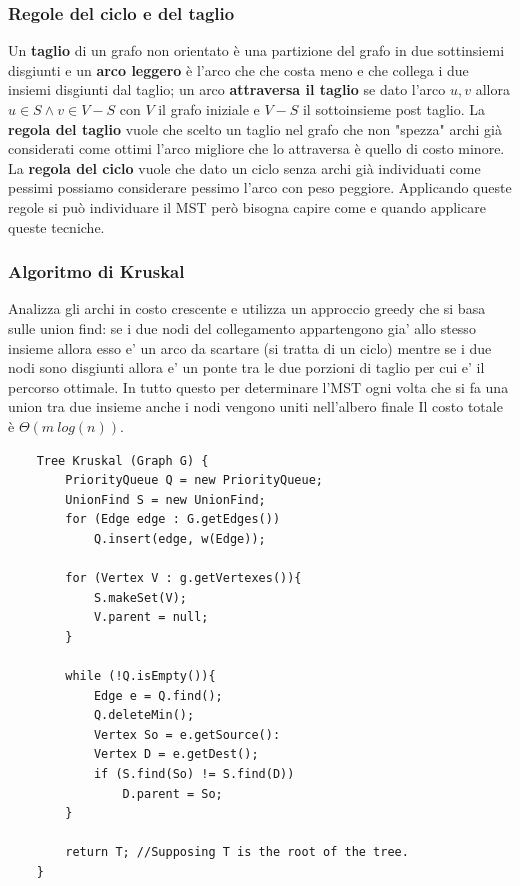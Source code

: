 \documentclass{article}
\begin{document}
\subsubsection{Regole del ciclo e del taglio}
Un \textbf{taglio} di un grafo non orientato è una partizione del grafo in due sottinsiemi disgiunti e un \textbf{arco leggero} è l'arco che che costa meno e che collega i due insiemi disgiunti dal taglio; 
un arco \textbf{attraversa il taglio} se dato l'arco ${u, v}$ allora $u \in S \land v \in V-S$ con $V$ il grafo iniziale e $V - S$ il sottoinsieme post taglio.
La \textbf{regola del taglio} vuole che scelto un taglio nel grafo che non "spezza" archi già considerati come ottimi l'arco migliore che lo attraversa è quello di costo minore.
La \textbf{regola del ciclo} vuole che dato un ciclo senza archi già individuati come pessimi possiamo considerare pessimo l'arco con peso peggiore.
Applicando queste regole si può individuare il MST però bisogna capire come e quando applicare queste tecniche.

\subsubsection{Algoritmo di Kruskal}
Analizza gli archi in costo crescente e utilizza un approccio greedy che si basa sulle union find: se i due nodi del collegamento appartengono gia' allo stesso insieme allora esso e' un arco da scartare (si tratta di un ciclo) mentre se i due nodi sono disgiunti allora e' un ponte tra le due porzioni di taglio per cui e' il percorso ottimale.
In tutto questo per determinare l'MST ogni volta che si fa una union tra due insieme anche i nodi vengono uniti nell'albero finale
Il costo totale è $\Theta(m\ log(n))$.


\begin{verbatim}
    Tree Kruskal (Graph G) {
        PriorityQueue Q = new PriorityQueue;
        UnionFind S = new UnionFind;
        for (Edge edge : G.getEdges())
            Q.insert(edge, w(Edge));
        
        for (Vertex V : g.getVertexes()){
            S.makeSet(V);
            V.parent = null;
        }

        while (!Q.isEmpty()){
            Edge e = Q.find();
            Q.deleteMin();
            Vertex So = e.getSource():
            Vertex D = e.getDest();
            if (S.find(So) != S.find(D))
                D.parent = So;
        }
        
        return T; //Supposing T is the root of the tree.
    }
\end{verbatim}
\end{document}
